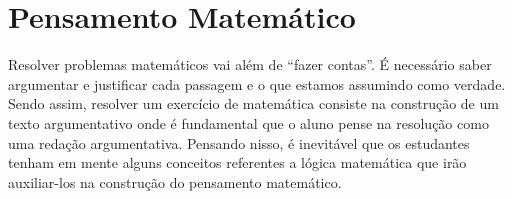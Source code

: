 \chapter{Pensamento Matemático}
\label{cap:Pensamento_Matematico}

\minitoc

Resolver problemas matemáticos vai além de ``fazer contas''. É necessário saber
argumentar e justificar cada passagem e o que estamos assumindo como verdade.
Sendo assim, resolver um exercício de matemática consiste na construção de um
texto argumentativo onde é fundamental que o aluno pense na resolução como uma
redação argumentativa. Pensando nisso, é inevitável que os estudantes tenham em
mente alguns conceitos referentes a lógica matemática que irão auxiliar-los na
construção do pensamento matemático.








